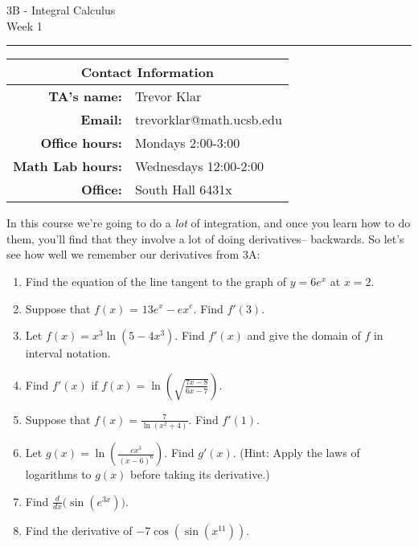 \documentclass[12pt,letterpaper]{article}
\begin{document}
\thispagestyle{fancy}
\begin{center}
3B - Integral Calculus \\
Week 1 %
\end{center}

\hrule

\begin{center}
\begin{tabular}{|rl|}
\hline
\multicolumn{2}{|c|}{Contact Information} \\
\hline
\bf{TA's name:} & Trevor Klar \\
\bf{Email:} & trevorklar@math.ucsb.edu \\
\bf{Office hours:} & Mondays 2:00-3:00 \\
\bf{Math Lab hours:} & Wednesdays 12:00-2:00 \\
\bf{Office:} & South Hall 6431x \\
\hline
\end{tabular}
\end{center}


In this course we're going to do a \emph{lot} of integration, and once you learn how to do them, you'll find that they involve a lot of doing derivatives-- backwards. So let's see how well we remember our derivatives from 3A:
\bigskip

\begin{enumerate}
\item Find the equation of the line tangent to the graph of $y = 6e^x$ at $x = 2$.
\vfill

\item Suppose that $f(x)$ = $13e^x - ex^e$. Find $f'(3)$.
\vfill

\item Let $f(x) = x^3\ln(5-4x^3)$. Find $f'(x)$ and give the domain of $f$ in interval notation.
\vfill

\pagebreak

\item Find $f'(x)$ if $f(x) = \ln\left(\sqrt{\frac{7x-8}{6x-7}}\right)$. 
\vfill

\item Suppose that $f(x) = \frac{7}{\ln(x^2+4)}$. Find $f'(1)$. 
\vfill

\item Let $g(x) = \ln\left(\frac{ex^3}{(x-6)^6}\right)$. Find $g'(x)$. (Hint: Apply the
laws of logarithms to $g(x)$ before taking its derivative.)
\vfill

\item Find $\frac{d}{dx}\big(\sin(e^{3x})\big)$. 
\vfill

\item Find the derivative of $-7\cos(\sin(x^11))$.
\vfill


\end{enumerate}
\end{document}

